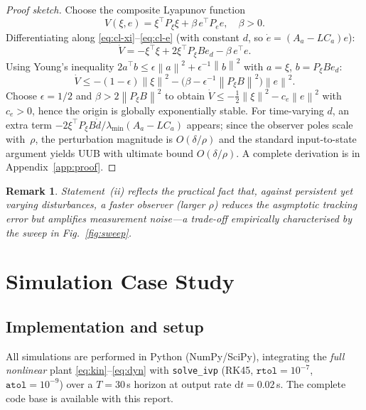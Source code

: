 \documentclass[conference]{IEEEtran}
\newtheorem{remark}{Remark}
\newcommand{\norm}[1]{\left\lVert#1\right\rVert}
\begin{document}
\begin{proof}[Proof sketch]
Choose the composite Lyapunov function
\begin{equation}
V(\xi,e)=\xi^\top P_\xi\xi+\beta\,e^\top P_e e,\quad \beta>0.
\label{eq:lyap}
\end{equation}
Differentiating along \eqref{eq:cl-xi}--\eqref{eq:cl-e} (with constant $d$,
so $\dot e=(A_a-LC_a)e$):
\begin{equation*}
\dot V=-\xi^\top\xi+2\xi^\top P_\xi B e_d-\beta\,e^\top e.
\end{equation*}
Using Young's inequality $2a^\top b\le \epsilon\norm{a}^2+\epsilon^{-1}\norm{b}^2$
with $a=\xi$, $b=P_\xi B e_d$:
\begin{equation*}
\dot V\le-(1-\epsilon)\norm\xi^2-\bigl(\beta-\epsilon^{-1}\norm{P_\xi B}^2\bigr)\norm e^2.
\end{equation*}
Choose $\epsilon=1/2$ and $\beta>2\norm{P_\xi B}^2$ to obtain
$\dot V\le -\tfrac12\norm\xi^2-c_e\norm e^2$ with $c_e>0$, hence the
origin is globally exponentially stable. For time-varying $d$, an extra
term $-2\xi^\top P_\xi B\dot d/\lambda_{\min}(A_a-LC_a)$ appears; since the
observer poles scale with~$\rho$, the perturbation magnitude is
$O(\delta/\rho)$ and the standard input-to-state argument yields UUB with
ultimate bound $O(\delta/\rho)$. A complete derivation is in
Appendix~\ref{app:proof}.
\end{proof}

\begin{remark}
Statement~(ii) reflects the practical fact that, against persistent yet
varying disturbances, a faster observer (larger $\rho$) reduces the
asymptotic tracking error but amplifies measurement noise---a trade-off
empirically characterised by the sweep in Fig.~\ref{fig:sweep}.
\end{remark}

\section{Simulation Case Study}\label{sec:results}

\subsection{Implementation and setup}

All simulations are performed in Python (NumPy/SciPy), integrating the
\emph{full nonlinear} plant \eqref{eq:kin}--\eqref{eq:dyn} with
\texttt{solve\_ivp} (RK45, $\mathtt{rtol}{=}10^{-7}$,
$\mathtt{atol}{=}10^{-9}$) over a $T=30$\,s horizon at output rate
$\mathrm{d}t=0.02$\,s. The complete code base is available with this
report.
\end{document}
